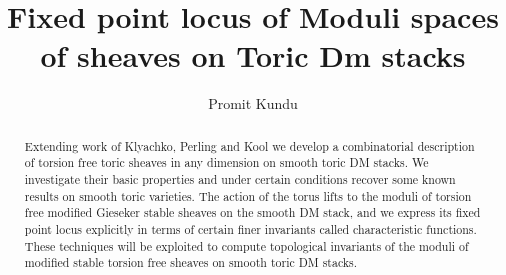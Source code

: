 \documentclass[10pt]{amsart}
\title[Fixed point locus of Moduli spaces of Sheaves on Toric DM stacks]{Fixed point locus of Moduli spaces of sheaves on Toric Dm stacks}
\author{ Promit Kundu}
\numberwithin{equation}{subsection}
\begin{document}
\sloppy 
\begin{abstract}
Extending work of Klyachko, Perling and Kool we develop a combinatorial description of torsion free toric sheaves in any dimension on smooth toric DM stacks. We investigate their basic properties and under certain conditions recover some known results on smooth toric varieties. The action of the torus lifts to the moduli of torsion free modified Gieseker stable sheaves on the smooth DM stack, and we express its fixed point locus explicitly in terms of certain finer invariants called characteristic functions. These techniques will be exploited to compute topological invariants of the moduli of modified stable torsion free sheaves on smooth toric DM stacks. 
\end{abstract}


\maketitle

\tableofcontents
\end{document}
